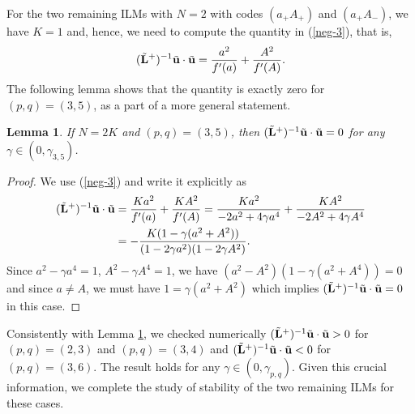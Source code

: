 \documentclass[12pt,reqno]{amsart}
\newtheorem{lemma}{Lemma}
\begin{document}
For the two remaining ILMs with $N = 2$ with codes $(a_+A_+)$ and $(a_+A_-)$, we have $K = 1$ and, hence, we need to compute the quantity in (\ref{neg-3}), that is, 
$$
(\tilde{\bf L}^+)^{-1} \tilde{\bf u} \cdot \tilde{\bf u} = \frac{a^2}{f'(a)} + \frac{A^2}{f'(A)}.
$$
The following lemma shows that the quantity is exactly zero for $(p,q) = (3,5)$, as a part of a more general statement. 

\begin{lemma}
	\label{lem-3-5}
	If $N = 2K$ and $(p,q) = (3,5)$, then $(\tilde{\bf L}^+)^{-1} \tilde{\bf u} \cdot \tilde{\bf u} = 0$ for any $\gamma \in (0,\gamma_{{3,5}})$.
\end{lemma}

\begin{proof}
We use (\ref{neg-3}) and write it explicitly  as
\begin{align*}
(\tilde{\bf L}^+)^{-1} \tilde{\bf u} \cdot \tilde{\bf u} &= \frac{Ka^2}{f'(a)} + \frac{KA^2}{f'(A)} = \frac{Ka^2}{-2a^2 + 4 \gamma a^4} + \frac{KA^2}{-2A^2 + 4 \gamma A^4} \\
&= -\frac{K(1-\gamma(a^2 + A^2))}{(1-2\gamma a^2)(1-2 \gamma A^2)}.
\end{align*}
Since $a^2 - \gamma a^4 = 1$, $A^2 - \gamma A^4 = 1$, 
we have $(a^2 - A^2) (1 - \gamma(a^2 + A^4)) = 0$ and since $a \neq A$, 
we must have $1 = \gamma (a^2 + A^2)$ which implies  $(\tilde{\bf L}^+)^{-1} \tilde{\bf u} \cdot \tilde{\bf u} = 0$ in this case.
\end{proof}

Consistently with Lemma \ref{lem-3-5}, we checked numerically $	(\tilde{\bf L}^+)^{-1} \tilde{\bf u} \cdot \tilde{\bf u} > 0$ for $(p,q) = (2,3)$ and $(p,q) = (3,4)$ and $(\tilde{\bf L}^+)^{-1} \tilde{\bf u} \cdot \tilde{\bf u} < 0$ 
for $(p,q) = (3,6)$. The result holds for any $\gamma \in (0,\gamma_{{p,q}})$. 
Given this crucial information, we complete the study of stability of the two 
remaining ILMs for these cases. 
\end{document}
